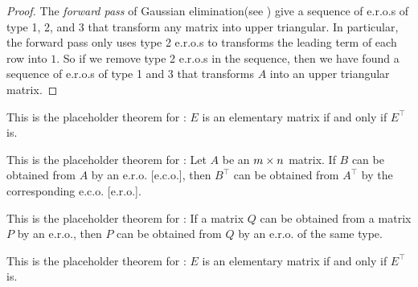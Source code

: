\begin{proof}
The \emph{forward pass} of Gaussian elimination(see ) give a sequence of e.r.o.s of type 1, 2, and 3 that transform any matrix into upper triangular.
In particular, the forward pass only uses type 2 e.r.o.s to transforms the leading term of each row into \(1\).
So if we remove type 2 e.r.o.s in the sequence, then we have found a sequence of e.r.o.s of type 1 and 3 that transforms \(A\) into an upper triangular matrix.
\end{proof}

\begin{additional theorem} \label{athm 3.1}
This is the placeholder theorem for : \(E\) is an elementary matrix if and only if \(E^\top\) is.
\end{additional theorem}

\begin{additional theorem} \label{athm 3.2}
This is the placeholder theorem for : Let \(A\) be an \(m \times n\) matrix.
If \(B\) can be obtained from \(A\) by an e.r.o. [e.c.o.], then \(B^\top\) can be obtained from \(A^\top\) by the corresponding e.c.o. [e.r.o.].
\end{additional theorem}

\begin{additional theorem} \label{athm 3.3}
This is the placeholder theorem for : If a matrix \(Q\) can be obtained from a matrix \(P\) by an e.r.o., then \(P\) can be obtained from \(Q\) by an e.r.o. of the same type.
\end{additional theorem}

\begin{additional theorem} \label{athm 3.4}
This is the placeholder theorem for : \(E\) is an elementary matrix if and only if \(E^\top\) is.
\end{additional theorem}
